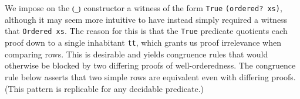 \documentclass[authoryear, acmsmall, screen, review, nonacm]{acmart}
\begin{document}
\begin{code}[hide]
\AgdaSymbol{(\AgdaUnderscore{}}\AgdaSpace{}%
\AgdaOperator{\AgdaInductiveConstructor{,}}\AgdaSpace{}%
\AgdaSymbol{)}\AgdaSpace{}%
\AgdaSpace{}%
\AgdaSpace{}%
\AgdaSpace{}%
\AgdaSymbol{\})}\<%
\\
\>[0]\AgdaSpace{}%
\AgdaSymbol{|}\AgdaSpace{}%
\AgdaSpace{}%
%
\>[12]\AgdaSymbol{|}\AgdaSpace{}%
\AgdaSpace{}%
%
\>[21]\AgdaSymbol{=}\AgdaSpace{}%
\AgdaSpace{}%
\AgdaSpace{}%
\AgdaSymbol{\{}\AgdaSpace{}%
\AgdaSymbol{(}\AgdaSpace{}%
\AgdaOperator{\AgdaInductiveConstructor{,}}\AgdaSpace{}%
\AgdaSymbol{\AgdaUnderscore{})}\AgdaSpace{}%
\AgdaSpace{}%
\AgdaSpace{}%
\AgdaSymbol{\})}\<%
\\
\>[0]\AgdaSpace{}%
\AgdaSymbol{|}\AgdaSpace{}%
%
\>[10]\AgdaSpace{}%
\AgdaSymbol{|}\AgdaSpace{}%
%
\>[18]%
\>[21]\AgdaSymbol{=}\AgdaSpace{}%
\AgdaSpace{}%
\AgdaSpace{}%
\AgdaSymbol{\{}\AgdaSpace{}%
\AgdaSymbol{(}\AgdaSpace{}%
\AgdaOperator{\AgdaInductiveConstructor{,}}\AgdaSpace{}%
\AgdaSymbol{\AgdaUnderscore{})}\AgdaSpace{}%
\AgdaSpace{}%
\AgdaSpace{}%
\AgdaSymbol{\})}\<%
\end{code} 
We impose on the \verb!⦅_⦆! constructor a witness of the form \verb!True! \verb!(ordered? xs)!, although it may seem more intuitive to have instead simply required a witness that \verb!Ordered xs!. The reason for this is that the \verb!True! predicate quotients each proof down to a single inhabitant \verb!tt!, which grants us proof irrelevance when comparing rows. This is desirable and yields congruence rules that would otherwise be blocked by two differing proofs of well-orderedness. The congruence rule below asserts that two simple rows are equivalent even with differing proofs. (This pattern is replicable for any decidable predicate.)
\end{document}
